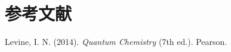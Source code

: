 \chapter*{参考文献}
\begin{thebibliography}{9}
	Levine, I. N. (2014). \emph{Quantum Chemistry} (7th ed.). Pearson.
\end{thebibliography}